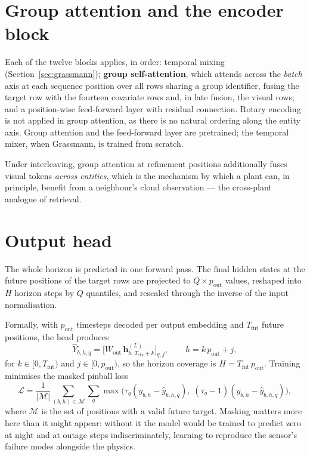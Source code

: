 \section{Group attention and the encoder block}
\label{sec:block}

Each of the twelve blocks applies, in order: temporal mixing (Section~\ref{sec:grassmann});
\textbf{group self-attention}, which attends across the \emph{batch} axis at each sequence
position over all rows sharing a group identifier, fusing the target row with the fourteen
covariate rows and, in late fusion, the visual rows; and a position-wise feed-forward layer
with residual connection. Rotary encoding is not applied in group attention, as there is no
natural ordering along the entity axis. Group attention and the feed-forward layer are
pretrained; the temporal mixer, when Grassmann, is trained from scratch.

Under interleaving, group attention at refinement positions additionally fuses visual tokens
\emph{across entities}, which is the mechanism by which a plant can, in principle, benefit
from a neighbour's cloud observation --- the cross-plant analogue of retrieval.

\section{Output head}
\label{sec:head}

The whole horizon is predicted in one forward pass. The final hidden states at the future
positions of the target rows are projected to $Q \times p_{\text{out}}$ values, reshaped into
$H$ horizon steps by $Q$ quantiles, and rescaled through the inverse of the input
normalisation.

Formally, with $p_{\text{out}}$ timesteps decoded per output embedding and $T_{\text{fut}}$
future positions, the head produces
\[
  \hat{Y}_{b,h,q} =
  \bigl[W_{\text{out}}\, \mathbf{h}^{(L)}_{b,\,T_{\text{ctx}}+k}\bigr]_{q,j},
  \qquad h = k\,p_{\text{out}} + j,
\]
for $k \in [0, T_{\text{fut}})$ and $j \in [0, p_{\text{out}})$, so the horizon coverage is
$H = T_{\text{fut}}\,p_{\text{out}}$. Training minimises the masked pinball loss
\[
  \mathcal{L} = \frac{1}{|\mathcal{M}|}\sum_{(b,h) \in \mathcal{M}} \sum_{q}
  \max\bigl(\tau_q (y_{b,h} - \hat{y}_{b,h,q}),\;
            (\tau_q - 1)(y_{b,h} - \hat{y}_{b,h,q})\bigr),
\]
where $\mathcal{M}$ is the set of positions with a valid future target. Masking matters more
here than it might appear: without it the model would be trained to predict zero at night
and at outage steps indiscriminately, learning to reproduce the sensor's failure modes
alongside the physics.

